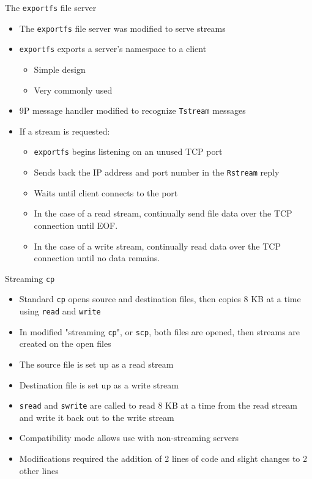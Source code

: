 \documentclass[11pt,compress]{beamer}
\begin{document}
\begin{frame}{The {\tt exportfs} file server}
\begin{itemize}
	\item The {\tt exportfs} file server was modified to serve streams
	\item {\tt exportfs} exports a server's namespace to a client
	\begin{itemize}
		\item Simple design
		\item Very commonly used
	\end{itemize}
	\item 9P message handler modified to recognize {\tt Tstream} messages
	\item If a stream is requested:
	\begin{itemize}
		\item {\tt exportfs} begins listening on an unused TCP port
		\item Sends back the IP address and port number in the {\tt Rstream} reply
		\item Waits until client connects to the port
		\item In the case of a read stream, continually send file data over the TCP connection until EOF.
		\item In the case of a write stream, continually read data over the TCP connection until no data remains.
	\end{itemize}
\end{itemize}
\end{frame}

\begin{frame}{Streaming {\tt cp}}
\begin{itemize}
	\item Standard {\tt cp} opens source and destination files, then copies 8 KB at a time using {\tt read} and {\tt write}
	\item In modified "streaming {\tt cp}", or {\tt scp}, both files are opened, then streams are created on the open files
	\item The source file is set up as a read stream
	\item Destination file is set up as a write stream
	\item {\tt sread} and {\tt swrite} are called to read 8 KB at a time from the read stream and write it back out to the write stream
	\item Compatibility mode allows use with non-streaming servers
	\item Modifications required the addition of 2 lines of code and slight changes to 2 other lines
\end{itemize}
\end{frame}
\end{document}
